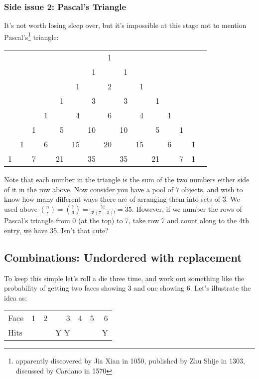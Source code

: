 \documentclass[12pt]{extbook}
\begin{document}
 
\subsubsection{Side issue 2: Pascal's Triangle}

It's not worth losing sleep over, but it's impossible at this stage not to mention Pascal's\footnote{apparently discovered by Jia Xian in 1050, published by Zhu Shije in 1303, discussed by Cardano in 1570} triangle:

\begin{footnotesize}
\begin{tabular}{rrrrrrrrrrrrrrr}
 & &  &  &  &  &  &1 &  &  &  &  & &\\
 & &  &  &  &  & 1&  &1 &  &  &  & &\\
 & &  &  &  & 1&  &2 &  & 1&  &  & &\\
 & &  &  & 1&  &3 &  &3 &  &1 &  & &\\
 & &  & 1&  &4 &  &6 &  &4 &  &1 & &\\
 & &1 &  & 5&  &10&  &10&  & 5&  &1& \\
 &1&  &6 &  &15&  &20&  &15&  & 6& & 1\\
1& & 7&  &21&  &35&  &35&  &21&  &7&1
\end{tabular}
\end{footnotesize}

Note that each number in the triangle is the sum of the two numbers either side of it in the row above.   Now consider you have a pool of $7$ objects, and wish to know how many different ways there are of arranging them into sets of $3$.   We used above ${n \choose r} = {7 \choose 3} =  \frac{7!}{3!(7-3)!} = 35$.   However, if we number the rows of Pascal's triangle from 0 (at the top) to 7, take row 7 and count along to the 4th entry, we have 35.   Isn't that cute?


 

\subsection{Combinations: Undordered with replacement}

To keep this simple let's roll a die three time, and work out something like the probability of getting two faces showing $3$ and one showing $6$.   Let's illustrate the idea as:

\begin{tabular}{lr|r|r|r|r|r}
Face & 1 & 2 & 3 & 4 & 5 & 6\\
Hits &   &   &Y Y&   &   & Y
\end{tabular}
\end{document}
